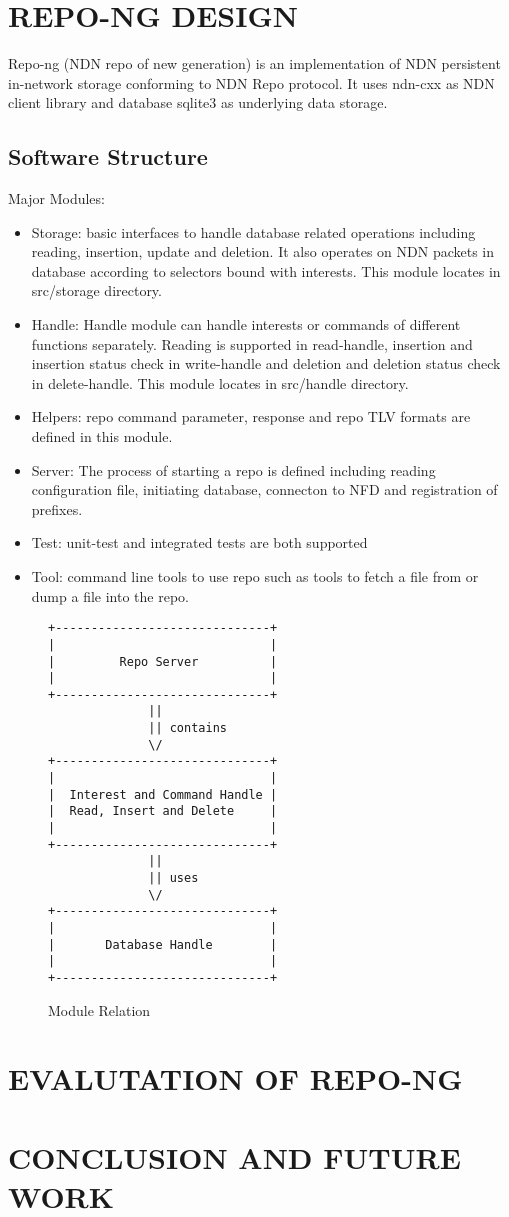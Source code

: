 \documentclass{acm_proc_article-sp}
\begin{document}
\section{REPO-NG DESIGN}
Repo-ng (NDN repo of new generation) is an implementation of NDN persistent in-network storage conforming to NDN Repo protocol. It uses ndn-cxx as NDN client library and database sqlite3 as underlying data storage.

\subsection{Software Structure}
Major Modules:
\begin{itemize}
\item Storage: basic interfaces to handle database related operations including reading, insertion, update and deletion. It also operates on NDN packets in database according to selectors bound with interests. This module locates in src/storage directory.
\item Handle: Handle module can handle interests or commands of different functions separately. Reading is supported in read-handle, insertion and insertion status check in write-handle and deletion and deletion status check in delete-handle. This module locates in src/handle directory.
\item Helpers: repo command parameter, response and repo TLV formats are defined in this module.
\item Server: The process of starting a repo is defined  including reading configuration file, initiating database, connecton to NFD and registration of prefixes.
\item Test: unit-test and integrated tests are both supported
\item Tool: command line tools to use repo such as tools to fetch a file from or dump a file into the repo.
\end{itemize}

\begin{figure*}
\centering
\begin{BVerbatim}
+------------------------------+
|                              |
|         Repo Server          |
|                              |
+------------------------------+
              ||
              || contains
              \/
+------------------------------+
|                              |
|  Interest and Command Handle |
|  Read, Insert and Delete     |
|                              |
+------------------------------+
              ||
              || uses
              \/
+------------------------------+
|                              |
|       Database Handle        |
|                              |
+------------------------------+

\end{BVerbatim}
\caption{Module Relation}
\end{figure*}

\section{EVALUTATION OF REPO-NG}

\section{CONCLUSION AND FUTURE WORK}



\end{document}
